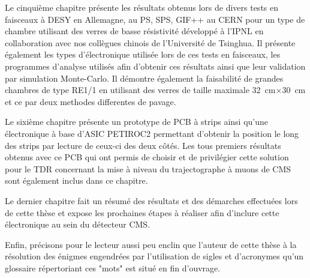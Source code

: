 Le cinquième chapitre présente les résultats obtenus lors de divers tests en faisceaux à DESY en Allemagne, au PS, SPS, GIF++ au CERN pour un type de chambre utilisant des verres de basse résistivité développé à l'IPNL en collaboration avec nos collègues chinois de l'Université de Tsinghua. Il présente également les types d'électronique utilisée lors de ces tests en faisceaux, les programmes d'analyse utilisés afin d'obtenir ces résultats ainsi que leur validation par simulation Monte-Carlo. Il démontre également la faisabilité de grandes chambres de type RE1/1 en utilisant des verres de taille maximale \SI{32}{\centi\meter}$\times$\SI{30}{\centi\meter} et ce par deux methodes differentes de pavage.

Le sixième chapitre présente un prototype de PCB à strips ainsi qu'une électronique à base d'ASIC PETIROC2 permettant d'obtenir la position le long des strips par lecture de ceux-ci des deux côtés. Les tous premiers résultats obtenus avec ce PCB qui ont permis de choisir et de privilégier cette solution pour le TDR concernant la mise à niveau du trajectographe à muons de CMS sont également inclus dans ce chapitre.

Le dernier chapitre fait un résumé des résultats et des démarches effectuées lors de cette thèse et expose les prochaines étapes à réaliser afin d'inclure cette électronique au sein du détecteur CMS.

Enfin, précisons pour le lecteur aussi peu enclin que l'auteur de cette thèse à la résolution des énigmes engendrées par l'utilisation de sigles  et d'acronymes qu'un glossaire répertoriant ces "mots" est situé en fin d'ouvrage.


